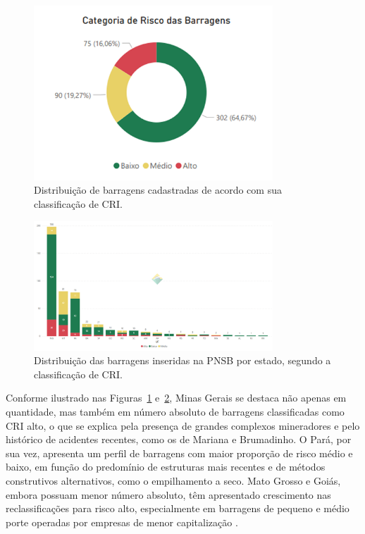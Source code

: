 \begin{figure}[htbp]
    \centering
    \includegraphics[width=0.8\textwidth]{figures/image29_distribuicao_barragens_classificacao_cri.png}
    \caption{Distribuição de barragens cadastradas de acordo com sua classificação de CRI.}
    \label{fig:distribuicao_barragens_classificacao_cri}
\end{figure}

\begin{figure}[htbp]
    \centering
    \includegraphics[width=0.8\textwidth]{figures/image30_distribuicao_barragens_classificacao_cri_estado.png}
    \caption{Distribuição das barragens inseridas na PNSB por estado, segundo a classificação de CRI.}
    \label{fig:distribuicao_barragens_classificacao_cri_estado}
\end{figure}

Conforme ilustrado nas Figuras~\ref{fig:distribuicao_barragens_classificacao_cri} e~\ref{fig:distribuicao_barragens_classificacao_cri_estado}, Minas Gerais se destaca não apenas em quantidade, mas também em número absoluto de barragens classificadas como CRI alto, o que se explica pela presença de grandes complexos mineradores e pelo histórico de acidentes recentes, como os de Mariana e Brumadinho. O Pará, por sua vez, apresenta um perfil de barragens com maior proporção de risco médio e baixo, em função do predomínio de estruturas mais recentes e de métodos construtivos alternativos, como o empilhamento a seco. Mato Grosso e Goiás, embora possuam menor número absoluto, têm apresentado crescimento nas reclassificações para risco alto, especialmente em barragens de pequeno e médio porte operadas por empresas de menor capitalização \cite{anm2025boletim}.

